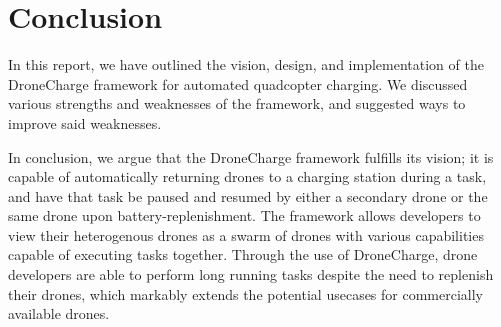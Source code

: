 \section{Conclusion}
In this report, we have outlined the vision, design, and implementation of the DroneCharge framework for automated quadcopter charging. We discussed various strengths and weaknesses of the framework, and suggested ways to improve said weaknesses.

In conclusion, we argue that the DroneCharge framework fulfills its vision; it is capable of automatically returning drones to a charging station during a task, and have that task be paused and resumed by either a secondary drone or the same drone upon battery-replenishment. The framework allows developers to view their heterogenous drones as a swarm of drones with various capabilities capable of executing tasks together. Through the use of DroneCharge, drone developers are able to perform long running tasks despite the need to replenish their drones, which markably extends the potential usecases for commercially available drones.